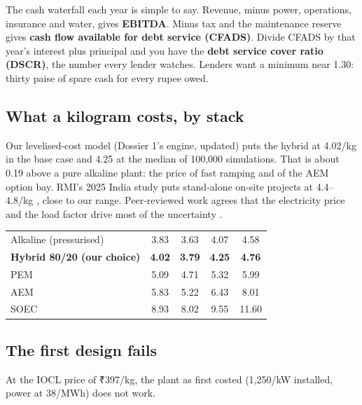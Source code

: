 \noindent The cash waterfall each year is simple to say. Revenue, minus power, operations, insurance and water, gives \textbf{EBITDA}. Minus tax and the maintenance reserve gives \textbf{cash flow available for debt service (CFADS)}. Divide CFADS by that year's interest plus principal and you have the \textbf{debt service cover ratio (DSCR)}, the number every lender watches. Lenders want a minimum near 1.30: thirty paise of spare cash for every rupee owed.

\subsection{What a kilogram costs, by stack}
Our levelised-cost model (Dossier 1's engine, updated) puts the hybrid at \usd{}4.02/kg in the base case and \usd{}4.25 at the median of 100,000 simulations. That is about \usd{}0.19 above a pure alkaline plant: the price of fast ramping and of the AEM option bay. RMI's 2025 India study puts stand-alone on-site projects at \usd{}4.4--4.8/kg \cite{rmi2025}, close to our range. Peer-reviewed work agrees that the electricity price and the load factor drive most of the uncertainty \cite{benalcazar2022,glenk2019}. \confM

\begin{center}\tablefont
\begin{tabularx}{\textwidth}{@{}L c c c c@{}}
\toprule
{} &  &  &  & \\ \midrule
Alkaline (pressurised) & 3.83 & 3.63 & 4.07 & 4.58\\
\textbf{Hybrid 80/20 (our choice)} & \textbf{4.02} & \textbf{3.79} & \textbf{4.25} & \textbf{4.76}\\
PEM & 5.09 & 4.71 & 5.32 & 5.99\\
AEM & 5.83 & 5.22 & 6.43 & 8.01\\
SOEC & 8.93 & 8.02 & 9.55 & 11.60\\
\bottomrule
\end{tabularx}
\end{center}

\subsection{The first design fails}
At the IOCL price of ₹397/kg, the plant as first costed (\usd{}1,250/kW installed, power at \usd{}38/MWh) does not work.

